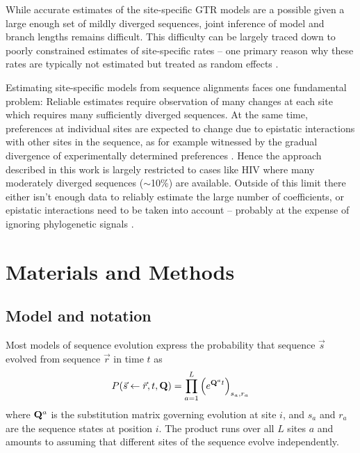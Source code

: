 \documentclass[aps,rmp,twocolumn]{revtex4}
\newcommand{\bq}{\begin{equation}}
\newcommand{\eq}{\end{equation}}
\newcommand{\mat}[1]{{\bf #1}}
\begin{document}
While accurate estimates of the site-specific GTR models are a possible given a large enough set of mildly diverged sequences, joint inference of model and branch lengths remains difficult.
This difficulty can be largely traced down to poorly constrained estimates of site-specific rates -- one primary reason why these rates are typically not estimated but treated as random effects \citep{yang1996among}.

Estimating site-specific models from sequence alignments faces one fundamental problem:
Reliable estimates require observation of many changes at each site which requires many sufficiently diverged sequences.
At the same time, preferences at individual sites are expected to change due to epistatic interactions with other sites in the sequence, as for example witnessed by the gradual divergence of experimentally determined preferences \citep{doud_site-specific_2015,haddox_mapping_2018}.
Hence the approach described in this work is largely restricted to cases like HIV where many moderately diverged sequences ($\sim$10\%) are available.
Outside of this limit there either isn't enough data to reliably estimate the large number of coefficients, or epistatic interactions need to be taken into account -- probably at the expense of ignoring phylogenetic signals \citep{morcos_direct-coupling_2011}.




\onecolumngrid

\section*{Materials and Methods}
\subsection*{Model and notation}
\label{sec:MM_model}
Most models of sequence evolution express the probability that sequence $\vec{s}$ evolved from sequence $\vec{r}$ in time $t$ as
\bq
P(\vec{s}\leftarrow \vec{r},t,\mat{Q}) = \prod_{a=1}^L \left(e^{\mat{Q}^{a} t}\right)_{s_{a},r_{a}}
\label{eq:P_prob}
\eq
where $\mat{Q}^{a}$ is the substitution matrix governing evolution at site $i$, and $s_{a}$ and $r_{a}$ are the sequence states at position $i$.
The product runs over all $L$ sites $a$ and amounts to assuming that different sites of the sequence evolve independently.
\end{document}
